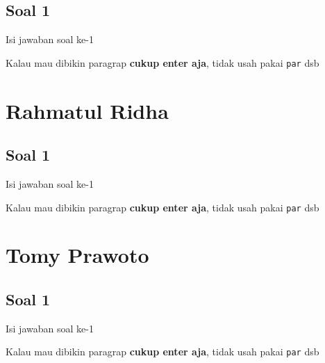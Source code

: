 \subsection{Soal 1}
Isi jawaban soal ke-1

Kalau mau dibikin paragrap \textbf{cukup enter aja}, tidak usah pakai \verb|par| dsb



\section{Rahmatul Ridha}
\subsection{Soal 1}
Isi jawaban soal ke-1

Kalau mau dibikin paragrap \textbf{cukup enter aja}, tidak usah pakai \verb|par| dsb



\section{Tomy Prawoto}
\subsection{Soal 1}
Isi jawaban soal ke-1

Kalau mau dibikin paragrap \textbf{cukup enter aja}, tidak usah pakai \verb|par| dsb



